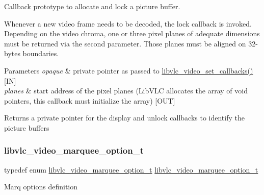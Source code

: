 Callback prototype to allocate and lock a picture buffer.

Whenever a new video frame needs to be decoded, the lock callback is invoked. Depending on the video chroma, one or three pixel planes of adequate dimensions must be returned via the second parameter. Those planes must be aligned on 32-\/bytes boundaries.


\begin{DoxyParams}{Parameters}
{\em opaque} & private pointer as passed to \hyperlink{group__libvlc__media__player_ga612605f2e5c638d9f4ed59021d714bf0}{libvlc\+\_\+video\+\_\+set\+\_\+callbacks()} \mbox{[}IN\mbox{]} \\
\hline
{\em planes} & start address of the pixel planes (Lib\+V\+LC allocates the array of void pointers, this callback must initialize the array) \mbox{[}O\+UT\mbox{]} \\
\hline
\end{DoxyParams}
\begin{DoxyReturn}{Returns}
a private pointer for the display and unlock callbacks to identify the picture buffers 
\end{DoxyReturn}
\mbox{\label{group__libvlc__media__player_ga82dd5710df44a4c244785c0150402844}} 
\subsubsection{\texorpdfstring{libvlc\+\_\+video\+\_\+marquee\+\_\+option\+\_\+t}{libvlc\_video\_marquee\_option\_t}}
{\footnotesize\ttfamily typedef enum \hyperlink{group__libvlc__media__player_ga412d5b45da5bda967f656cb17ecc83fd}{libvlc\+\_\+video\+\_\+marquee\+\_\+option\+\_\+t}  \hyperlink{group__libvlc__media__player_ga412d5b45da5bda967f656cb17ecc83fd}{libvlc\+\_\+video\+\_\+marquee\+\_\+option\+\_\+t}}

Marq options definition \mbox{\label{group__libvlc__media__player_ga024c0f0bba9d3b32a881c40f3cb479bb}} 

